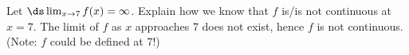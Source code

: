 {Let $\ds \lim_{x\to 7} f(x) = \infty$. Explain how we know that $f$ is/is not continuous at $x=7$.}
{The limit of $f$ as $x$ approaches 7 does not exist, hence $f$ is not continuous. (Note: $f$ could be defined at 7!)}
